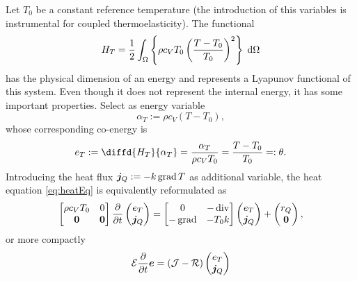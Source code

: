 Let $T_0$ be a constant reference temperature (the introduction of this variables is instrumental for coupled thermoelasticity). The functional 
\begin{equation*}
	H_T = \energy{\rho c_V T_0 \left(\frac{T-T_0}{T_0} \right)^2 }
\end{equation*} 
has the physical dimension of an energy and represents a Lyapunov functional of this system. Even though it does not represent the internal energy, it has some important properties. Select as energy variable 
\begin{equation*}
\alpha_T := \rho c_V (T-T_0),
\end{equation*}
whose corresponding co-energy is 
\begin{equation*}
	e_T := \diffd{H_T}{\alpha_T} = \frac{\alpha_T}{\rho c_V T_0} = \frac{T-T_0}{T_0} =: \theta.
\end{equation*}
Introducing the heat flux $\bm{j}_Q := -k \operatorname*{grad} T$ as additional variable, the heat equation \eqref{eq:heatEq} is equivalently reformulated as
\begin{equation}
\begin{bmatrix}
	\rho c_V T_0 & 0 \\
	\bm{0} & \bm{0} \\
	\end{bmatrix}
\diffp{}{t}
\begin{pmatrix}
e_T \\
\bm{j}_Q \\
\end{pmatrix} = 
\begin{bmatrix}
	0 & -\div \\
	-\grad & -T_0 k \\
\end{bmatrix}
\begin{pmatrix}
e_T \\
\bm{j}_Q \\
\end{pmatrix} + 
\begin{pmatrix}
r_Q \\
\bm{0} \\
\end{pmatrix},
\end{equation}
or more compactly 
\begin{equation}
	{\mathcal{E}}
	\diffp{}{t}
	\bm{e}  = \left( {\mathcal{J}} - {\mathcal{R}}
	\right)
	\begin{pmatrix}
	e_T \\
	\bm{j}_Q \\
	\end{pmatrix}
\end{equation}


